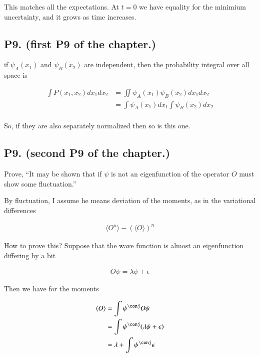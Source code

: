 \documentclass{article}
\newcommand{\expectation}[1]{\langle{#1}\rangle}
\begin{document}
This matches all the expectations.  At $t=0$ we have equality for the minimium uncertainty, and it grows as
time increases.

\subsection{ P9. (first P9 of the chapter.) }

if $\psi_A(x_1)$ and $\psi_B(x_2)$ are independent, then the probability integral over all space is

\begin{align*}
\int P(x_1, x_2) dx_1 dx_2
&=
\iint \psi_A(x_1) \psi_B(x_2) dx_1 dx_2 \\
&=
\int \psi_A(x_1) dx_1 \int \psi_B(x_2) dx_2 \\
\end{align*}

So, if they are also separately normalized then so is this one.

\subsection{ P9. (second P9 of the chapter.) }

Prove, ``It may be shown that if $\psi$ is not an eigenfunction of the operator $O$ must show some fluctuation.''

By fluctuation, I assume he means deviation of the moments, 
as in the variational differences

\begin{align*}
\expectation{O^n} - (\expectation{O})^n 
\end{align*}

How to prove this?  Suppose that the wave function is almost an eigenfunction
differing by a bit

\begin{align*}
O \psi = \lambda \psi + \epsilon
\end{align*}

Then we have for the moments

\begin{align*}
\expectation{O}
&= \int \psi^\conj O \psi \\
&= \int \psi^\conj ( \lambda \psi + \epsilon ) \\
&= \lambda + \int \psi^\conj \epsilon \\
\end{align*}
\end{document}

